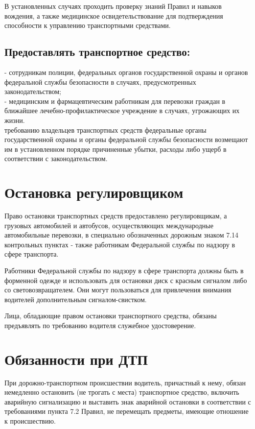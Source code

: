 \documentclass[russian,english,12pt,a4paper,reqno,dviphfm,oneside]{book}
\begin{document}
{В установленных случаях проходить проверку знаний Правил и навыков вождения, а также медицинское освидетельствование для подтверждения способности к управлению транспортными средствами.

\subsection [Предоставлять транспортное средство]{Предоставлять транспортное средство:}
\noindent- сотрудникам полиции, федеральных органов государственной охраны и органов федеральной службы безопасности в случаях, предусмотренных законодательством;\\
- медицинским и фармацевтическим работникам для перевозки граждан в ближайшее лечебно-профилактическое учреждение в случаях, угрожающих их жизни.\\
 требованию владельцев транспортных средств федеральные органы государственной охраны и органы федеральной службы безопасности возмещают им в установленном порядке причиненные убытки, расходы либо ущерб в соответствии с законодательством.\\

\section{Остановка регулировщиком} Право остановки транспортных средств предоставлено регулировщикам, а грузовых автомобилей и автобусов, осуществляющих международные автомобильные перевозки, в специально обозначенных дорожным знаком 7.14 контрольных пунктах - также работникам Федеральной службы по надзору в сфере транспорта.

Работники Федеральной службы по надзору в сфере транспорта должны быть в форменной одежде и использовать для остановки диск с красным сигналом либо со световозвращателем. Они могут пользоваться для привлечения внимания водителей дополнительным сигналом-свистком.

Лица, обладающие правом остановки транспортного средства, обязаны предъявлять по требованию водителя служебное удостоверение.\\

\section{Обязанности при ДТП} При дорожно-транспортном происшествии водитель, причастный к нему, обязан немедленно остановить (не трогать с места) транспортное средство, включить
аварийную сигнализацию и выставить знак аварийной остановки в соответствии с требованиями пункта 7.2 Правил, не перемещать предметы, имеющие отношение к происшествию.\\

}
\end{document}
